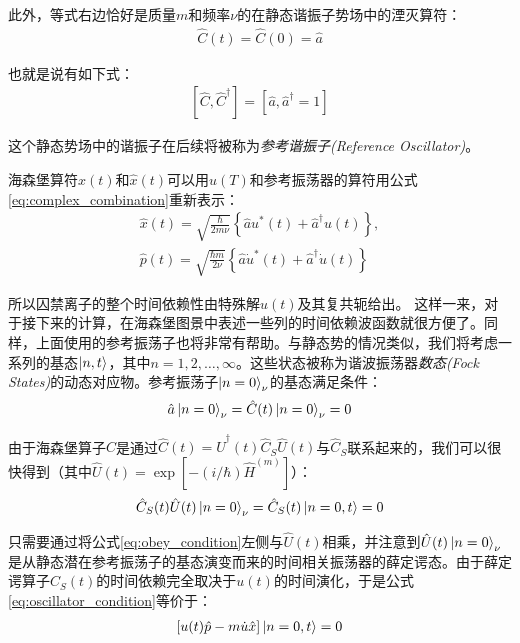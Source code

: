 此外，等式右边恰好是质量$m$和频率$\nu$的在静态谐振子势场中的湮灭算符：
\begin{align}
    \hat{C}(t)=\hat{C}(0)=\hat{a}
\end{align}

也就是说有如下式：
\begin{align}
    \left[\hat{C},\hat{C}^\dagger\right]=\left[\hat{a},\hat{a}^\dagger=1\right]
\end{align}

这个静态势场中的谐振子在后续将被称为\emph{参考谐振子(Reference Oscillator)}。

海森堡算符$\hat{x}(t)$和$\hat{x}(t)$可以用$u(T)$和参考振荡器的算符用公式\eqref{eq:complex_combination}重新表示：
\begin{align}
    \hat{x}(t)=\sqrt{\frac{\hbar}{2m\nu}}\left\{\hat{a}u^*(t)+\hat{a}^\dagger u(t)\right\},\\
    \hat{p}(t)=\sqrt{\frac{\hbar m}{2\nu}}\left\{\hat{a}\dot{u}^*(t)+\hat{a}^\dagger \dot{u}(t)\right\}
\end{align}

所以囚禁离子的整个时间依赖性由特殊解$u(t)$及其复共轭给出。
这样一来，对于接下来的计算，在海森堡图景中表述一些列的时间依赖波函数就很方便了。同样，上面使用的参考振荡子也将非常有帮助。与静态势的情况类似，我们将考虑一系列的基态$\ket{n,t}$，其中$n=1,2,\dots,\infty$。这些状态被称为谐波振荡器\emph{数态(Fock States)}的动态对应物。参考振荡子$\ket{n=0}_\nu$的基态满足条件：
\begin{align}
    \hat{a}\ket{n=0}_\nu=\hat{C}(t)\ket{n=0}_\nu=0 \label{eq:obey_condition}
\end{align}

由于海森堡算子$\hat{C}$是通过$\hat{C}(t)=\hat{U}^\dagger(t)\hat{C}_S\hat{U}(t)$与$\hat{C}_S$联系起来的，我们可以很快得到（其中$\hat{U}(t)=\exp{\left[-(i/\hbar)\hat{H}^{(m)}\right]}$）：
\begin{align}
    \hat{C}_S(t)\hat{U}(t)\ket{n=0}_\nu=\hat{C}_S(t)\ket{n=0,t}=0 \label{eq:oscillator_condition}
\end{align}

只需要通过将公式\eqref{eq:obey_condition}左侧与$\hat{U}(t)$相乘，并注意到$\hat{U}(t)\ket{n=0}_\nu$是从静态潜在参考振荡子的基态演变而来的时间相关振荡器的薛定谔态。由于薛定谔算子$C_S(t)$的时间依赖完全取决于$u(t)$的时间演化，于是公式\eqref{eq:oscillator_condition}等价于：
\begin{align}
    \left[u(t)\hat{p}-m\dot{u}\hat{x}\right]\ket{n=0,t}=0
\end{align}

